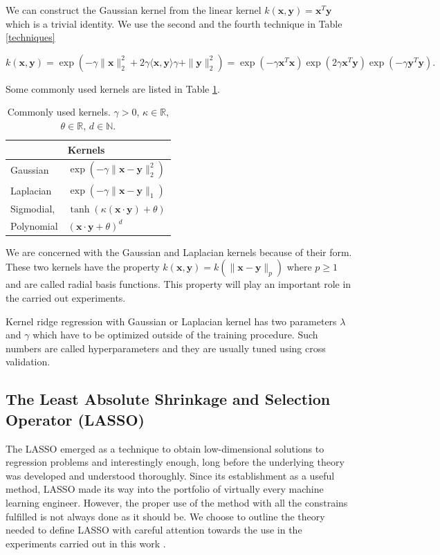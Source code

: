 \documentclass[11pt,oneside,czech,american]{book} %
\theoremstyle{definition} %
\theoremstyle{definition}
\begin{document}
We can construct the Gaussian kernel from the linear kernel $k(\bm{x}, \bm{y}) = \bm{x}^T \bm{y}$ which is a trivial identity. We use the second and the fourth technique in Table \ref{techniques}

\begin{equation}
	k(\bm{x}, \bm{y})= \exp(-\gamma \|\bm{x} \|^2_2 + 2\gamma \langle \bm{x}, \bm{y} \rangle \gamma + \|\bm{y} \|^2_2) = \exp(-\gamma \bm{x}^T \bm{x})  \exp(2\gamma  \bm{x}^T \bm{y})  \exp(-\gamma \bm{y}^T \bm{y}).
\end{equation}

Some commonly used kernels are listed in Table \ref{kernely}.

\begin{table}[H]
	\centering
	\begin{tabular}{ll} 
		\hline
		& Kernels  \\ 
		\hline
		Gaussian & $ \exp(-\gamma \|\bm{x}-\bm{y} \|^2_2)$   \\
		Laplacian & $ \exp(-\gamma \|\bm{x}-\bm{y} \|_1)$   \\
		Sigmodial, & $\tanh(\kappa (\bm{x} \cdot \bm{y}) + \theta)$   \\
		Polynomial & $(\bm{x} \cdot \bm{y} + \theta)^d$ \\
		\hline
	\end{tabular}
	\caption{Commonly used kernels. $\gamma > 0$, $\kappa \in \mathbb{R}$, $\theta \in \mathbb{R}$, $d \in \mathbb{N}$.}
	\label{kernely}
\end{table}

We are concerned with the Gaussian and Laplacian kernels because of their form. These two kernels have the property $k(\bm{x}, \bm{y}) = k(\| \bm{x}-\bm{y} \|_p)$ where $p\geq1$ and are called radial basis functions. This property will play an important role in the carried out experiments.

Kernel ridge regression with Gaussian or Laplacian kernel has two parameters $\lambda$ and $\gamma$ which have to be optimized outside of the training procedure. Such numbers are called hyperparameters and they are usually tuned using cross validation.


\subsection{The Least Absolute Shrinkage and Selection Operator (LASSO)}
The LASSO emerged as a technique to obtain low-dimensional solutions to regression problems and interestingly enough, long before the underlying theory was developed and understood thoroughly. Since its establishment as a useful method, LASSO made its way into the portfolio of virtually every machine learning engineer. However, the proper use of the method with all the constrains fulfilled is not always done as it should be. We choose to outline the theory needed to define LASSO with careful attention towards the use in the experiments carried out in this work \parencite{boche15}.
\end{document}
